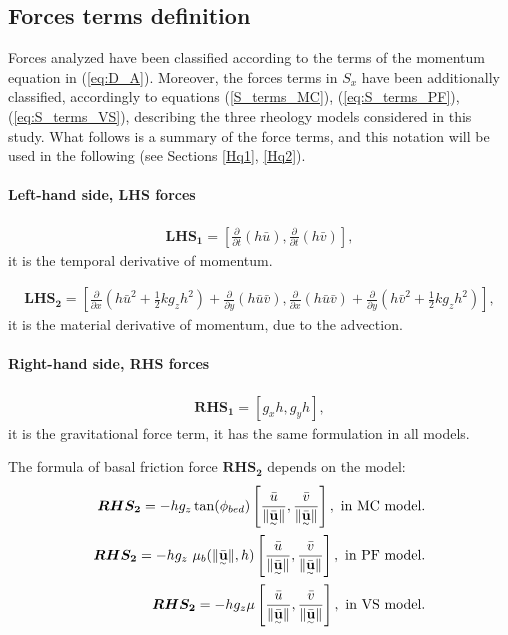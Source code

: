 \documentclass{article}
\begin{document}
\subsection{Forces terms definition}\label{sec:Fterms}
Forces analyzed have been classified according to the terms of the momentum equation in (\ref{eq:D_A}). Moreover, the forces terms in $S_x$ have been additionally classified, accordingly to equations (\ref{S_terms_MC}), (\ref{eq:S_terms_PF}), (\ref{eq:S_terms_VS}), describing the three rheology models considered in this study. What follows is a summary of the force terms, and this notation will be used in the following (see Sections \ref{Hq1}, \ref{Hq2}).

\paragraph{Left-hand side, LHS forces}
\begin{align}
\boldsymbol{LHS_1} = \left[\frac{\partial}{\partial t} (h\bar{u}), \frac{\partial}{\partial t} (h\bar{v})\right],
\end{align}
it is the temporal derivative of momentum.

\begin{align}
\boldsymbol{LHS_2} = \left[\frac{\partial}{\partial x}\left(h\bar{u}^2 + \frac{1}{2}k g_{z}h^2\right) + \frac{\partial}{\partial y}(h\bar{u}\bar{v}),\frac{\partial}{\partial x}(h\bar{u}\bar{v}) +
\frac{\partial}{\partial y}\left(h\bar{v}^2 + \frac{1}{2}k g_{z}h^2\right)\right],
\end{align}
it is the material derivative of momentum, due to the advection.

\paragraph{Right-hand side, RHS forces}
\begin{align}
\boldsymbol{RHS_1} = [g_x h,g_y h],
\end{align}
it is the gravitational force term, it has the same formulation in all models.

The formula of basal friction force $\boldsymbol{RHS_2}$ depends on the model:
\begin{align}
\boldsymbol{RHS_2} = -h g_z\tan(\phi_{bed})\left[\frac{\bar{u}}{\| \underset{^\sim}{\bar{\textbf u}} \|}, \frac{\bar{v}}{\| \underset{^\sim}{\bar{\textbf u}} \|} \right],\textmd{ in MC model.}\nonumber\\
\boldsymbol{RHS_2} = - h g_z \ \mu_{b}(\|\underset{^\sim}{\bar{\textbf{u}}} \| , h)\left[\frac{\bar{u}}{\| \underset{^\sim}{\bar{\textbf{u}}} \|}, \frac{\bar{v}}{\| \underset{^\sim}{\bar{\textbf{u}}} \|}\right],\textmd{ in PF model.}\\
\boldsymbol{RHS_2} = -h g_{z} \mu\left[\frac{\bar{u}}{\| \underset{^\sim}{\bar{\textbf u}}\|} , \frac{\bar{v}}{\| \underset{^\sim}{\bar{\textbf u}}\|}\right],\textmd{ in VS model.}\nonumber
\end{align}
\end{document}
